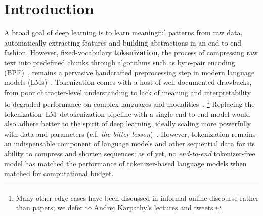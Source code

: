 \section{Introduction}
\label{sec: introduction}


A broad goal of deep learning is to learn meaningful patterns from raw data, automatically extracting features and building abstractions in an end-to-end fashion.
However, fixed-vocabulary \textbf{tokenization}, the process of compressing raw text into predefined chunks through algorithms such as byte-pair encoding (BPE)~\citep{BPE,SentencePiece}, remains a pervasive handcrafted preprocessing step in modern language models (LMs)~\citep{Llama3, GPT3}.
Tokenization comes with a host of well-documented drawbacks,
from poor character-level understanding to lack of meaning and interpretability to degraded performance on complex languages and modalities~\citep{petrov2023language, ahia2023all, belinkov2017synthetic, Adv-BERT, ByT5, Canine}.
\footnote{Many other edge cases have been discussed in informal online discourse rather than papers; we defer to Andrej Karpathy's \href{https://x.com/karpathy/status/1657949234535211009}{lectures} and \href{https://x.com/karpathy/status/1759996551378940395}{tweets}.}
Replacing the tokenization--LM--detokenization pipeline with a single end-to-end model would also adhere better to the spirit of deep learning, ideally scaling more powerfully with data and parameters (c.f. \emph{the bitter lesson})~\citep{sutton2019bitter,peric2025bitter}.
However, tokenization remains an indispensable component of language models and other sequential data for its ability to compress and shorten sequences; as of yet, no \emph{end-to-end} tokenizer-free model has matched the performance of tokenizer-based language models when matched for computational budget.

